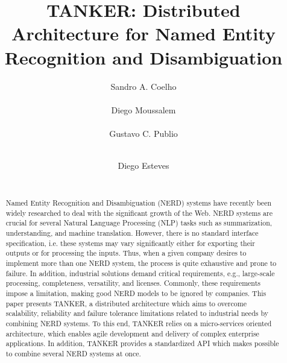 \documentclass{sig-alternate}
\begin{document}
\title{TANKER: Distributed Architecture for Named Entity Recognition and Disambiguation}

\author{
\alignauthor
Sandro A. Coelho\\
\\
\alignauthor
Diego Moussalem\\
\\
\alignauthor
Gustavo C. Publio\\
\\
\and
\alignauthor
Diego Esteves\\
\\
}
\maketitle

\begin{abstract}
Named Entity Recognition and Disambiguation (NERD) systems have recently been widely researched to deal with the significant growth of the Web. NERD systems are crucial for several Natural Language Processing (NLP) tasks such as summarization, understanding, and machine translation. However, there is no standard interface specification, i.e. these systems may vary significantly either for exporting their outputs or for processing the inputs. Thus, when a given company desires to implement more than one NERD system, the process is quite exhaustive and prone to failure. In addition, industrial solutions demand critical requirements, e.g., large-scale processing, completeness, versatility, and licenses. Commonly, these requirements impose a limitation, making good NERD models to be ignored by companies. This paper presents TANKER, a distributed architecture which aims to overcome scalability, reliability and failure tolerance limitations related to industrial needs by combining NERD systems. To this end, TANKER relies on a micro-services oriented architecture, which enables agile development and delivery of complex enterprise applications. In addition, TANKER provides a standardized API which makes possible to combine several NERD systems at once.
\end{abstract}
\end{document}
